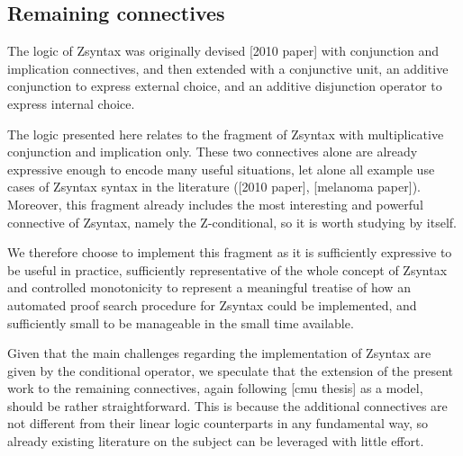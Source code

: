 \subsection{Remaining connectives}

The logic of Zsyntax was originally devised [2010 paper] with conjunction and
implication connectives, and then extended \cite{adding-logic} with a
conjunctive unit, an additive conjunction to express external choice, and an
additive disjunction operator to express internal choice.

The logic presented here relates to the fragment of Zsyntax with multiplicative
conjunction and implication only. These two connectives alone are already
expressive enough to encode many useful situations, let alone all example use
cases of Zsyntax syntax in the literature ([2010 paper], [melanoma
paper]). Moreover, this fragment already includes the most interesting and
powerful connective of Zsyntax, namely the Z-conditional, so it is worth
studying by itself.

We therefore choose to implement this fragment as it is sufficiently expressive
to be useful in practice, sufficiently representative of the whole concept of
Zsyntax and controlled monotonicity to represent a meaningful treatise of how an
automated proof search procedure for Zsyntax could be implemented, and
sufficiently small to be manageable in the small time available.

Given that the main challenges regarding the implementation of Zsyntax are given
by the conditional operator, we speculate that the extension of the present work
to the remaining connectives, again following [cmu thesis] as a model, should be
rather straightforward. This is because the additional connectives are not
different from their linear logic counterparts in any fundamental way, so
already existing literature on the subject can be leveraged with little effort.

